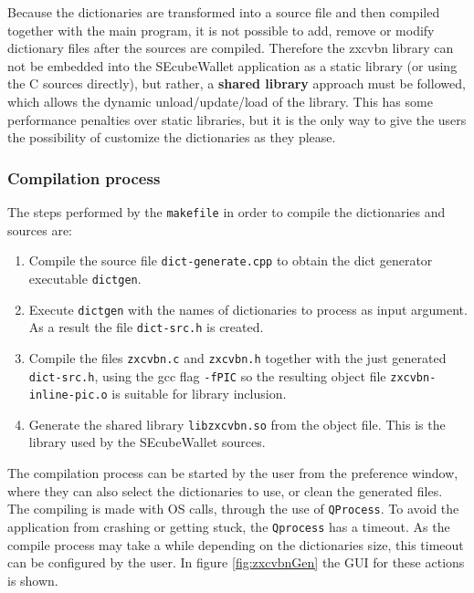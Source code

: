 Because the dictionaries are transformed into a source file and then compiled together with the main program, it is not possible to add, remove or modify dictionary files after the sources are compiled. Therefore the zxcvbn library can not be embedded into the SEcubeWallet application as a static library (or using the C sources directly), but rather, a \textbf{shared library} approach must be followed, which allows the dynamic unload/update/load of the library. This has some performance penalties over static libraries, but it is the only way to give the users the possibility of customize the dictionaries as they please.

\subsubsection*{Compilation process}

The steps performed by the \texttt{makefile} in order to compile the dictionaries and sources are:

\begin{enumerate}
\setlength\itemsep{-3pt}

\item Compile the source file \texttt{dict-generate.cpp} to obtain the dict generator executable \texttt{dictgen}.
\item Execute \texttt{dictgen} with the names of dictionaries to process as input argument. As a result the file \texttt{dict-src.h} is created.
\item Compile the files \texttt{zxcvbn.c} and \texttt{zxcvbn.h} together with the just generated \texttt{dict-src.h}, using the gcc flag \texttt{-fPIC} so the resulting object file \texttt{zxcvbn-inline-pic.o} is suitable for library inclusion.
\item Generate the shared library \texttt{libzxcvbn.so} from the object file. This is the library used by the SEcubeWallet sources.
\end{enumerate}

The compilation process can be started by the user from the preference window, where they can also select the dictionaries to use, or clean the generated files. The compiling is made with OS calls, through the use of \texttt{QProcess}. To avoid the application from crashing or getting stuck, the \texttt{Qprocess} has a timeout. As the compile process may take a while depending on the dictionaries size, this timeout can be configured by the user. In figure \ref{fig:zxcvbnGen} the GUI for these actions is shown.


